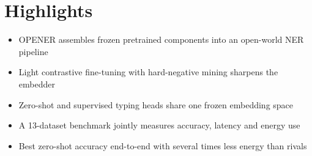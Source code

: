 \documentclass[12pt]{article}
\begin{document}
\section*{Highlights}

\begin{itemize}
  \item OPENER assembles frozen pretrained components into an open-world NER pipeline
  \item Light contrastive fine-tuning with hard-negative mining sharpens the embedder
  \item Zero-shot and supervised typing heads share one frozen embedding space
  \item A 13-dataset benchmark jointly measures accuracy, latency and energy use
  \item Best zero-shot accuracy end-to-end with several times less energy than rivals
\end{itemize}
\end{document}
